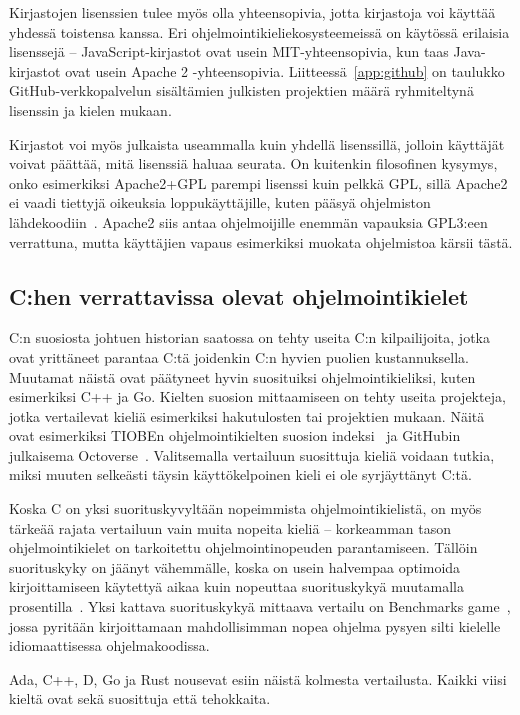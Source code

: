 Kirjastojen lisenssien tulee myös olla yhteensopivia, jotta kirjastoja voi
käyttää yhdessä toistensa kanssa. Eri ohjelmointikieliekosysteemeissä on
käytössä erilaisia lisenssejä -- JavaScript-kirjastot ovat usein
MIT-yhteensopivia, kun taas Java-kirjastot ovat usein Apache 2 -yhteensopivia.
Liitteessä~\ref{app:github} on taulukko GitHub-verkkopalvelun sisältämien
julkisten projektien määrä ryhmiteltynä lisenssin ja kielen mukaan.

Kirjastot voi myös julkaista useammalla kuin yhdellä lisenssillä, jolloin
käyttäjät voivat päättää, mitä lisenssiä haluaa seurata. On kuitenkin
filosofinen kysymys, onko esimerkiksi Apache2+GPL parempi lisenssi kuin pelkkä
GPL, sillä Apache2 ei vaadi tiettyjä oikeuksia loppukäyttäjille, kuten pääsyä
ohjelmiston lähdekoodiin~\citep{apachetldr, gpl3tldr}. Apache2 siis antaa
ohjelmoijille enemmän vapauksia GPL3:een verrattuna, mutta käyttäjien vapaus
esimerkiksi muokata ohjelmistoa kärsii tästä.

\subsection{C:hen verrattavissa olevat ohjelmointikielet}

C:n suosiosta johtuen historian saatossa on tehty useita C:n kilpailijoita,
jotka ovat yrittäneet parantaa C:tä joidenkin C:n hyvien puolien
kustannuksella. Muutamat näistä ovat päätyneet hyvin suosituiksi
ohjelmointikieliksi, kuten esimerkiksi C++ ja Go. Kielten suosion mittaamiseen
on tehty useita projekteja, jotka vertailevat kieliä esimerkiksi hakutulosten
tai projektien mukaan. Näitä ovat esimerkiksi TIOBEn ohjelmointikielten suosion
indeksi~\citep{tiobe} ja GitHubin julkaisema Octoverse~\citep{octoverse}.
Valitsemalla vertailuun suosittuja kieliä voidaan tutkia, miksi muuten selkeästi
täysin käyttökelpoinen kieli ei ole syrjäyttänyt C:tä.

Koska C on yksi suorituskyvyltään nopeimmista ohjelmointikielistä, on myös
tärkeää rajata vertailuun vain muita nopeita kieliä -- korkeamman tason
ohjelmointikielet on tarkoitettu ohjelmointinopeuden parantamiseen. Tällöin
suorituskyky on jäänyt vähemmälle, koska on usein halvempaa optimoida
kirjoittamiseen käytettyä aikaa kuin nopeuttaa suorituskykyä muutamalla
prosentilla~\citationneeded. Yksi kattava suorituskykyä mittaava vertailu on
Benchmarks game~\citep{benchmarks}, jossa pyritään kirjoittamaan mahdollisimman
nopea ohjelma pysyen silti kielelle idiomaattisessa ohjelmakoodissa.

Ada, C++, D, Go ja Rust nousevat esiin näistä kolmesta vertailusta. Kaikki
viisi kieltä ovat sekä suosittuja että tehokkaita.

